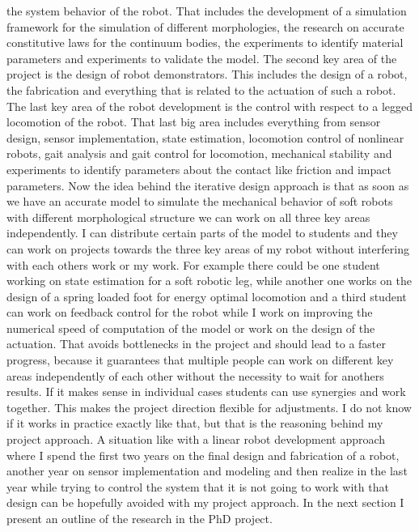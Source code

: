 the system behavior of the robot. That includes the development of a simulation framework for the simulation of different morphologies, the research on accurate constitutive laws for the 
continuum bodies, the experiments to identify material parameters and experiments to validate the model. The second key area of the project is the design of robot demonstrators. This
includes the design of a robot, the fabrication and everything that is related to the actuation of such a robot. The last key area of the robot development is the control with
respect to a legged locomotion of the robot. That last big area includes everything from sensor design, sensor implementation, state estimation, locomotion control of nonlinear robots,
gait analysis and gait control for locomotion, mechanical stability and experiments to identify parameters about the contact like friction and impact parameters. 
%
Now the idea behind the iterative design approach is that as soon as we have an accurate model to simulate the mechanical behavior of soft robots with different morphological structure
we can work on all three key areas independently. I can distribute certain parts of the model to students and they can work on projects towards the three key areas of my robot without
interfering with each others work or my work.
%
For example there could be one student working on state estimation for a soft robotic leg, while another one works on the design of a spring loaded foot for energy optimal
 locomotion and a third student can work on feedback control for the robot while I work on improving the numerical speed of computation of the model or work on the design of 
 the actuation.
%
That avoids bottlenecks in the project and should lead to a faster progress, because it guarantees that multiple people can work on different key areas independently of each other without the
 necessity to wait for anothers results. If it makes sense in individual cases students can use synergies and work together. This makes the project direction flexible for adjustments. I do not know if
  it works in practice exactly like that, but that is the reasoning behind my project approach.
%
A situation like with a linear robot development approach where I spend the first two years on the final design and fabrication of a robot, another year on sensor implementation
 and modeling and then realize in the last year while trying to control the system that it is not going to work with that design can be hopefully avoided with my project approach.
%
%
In the next section I present an outline of the research in the PhD project.
%
